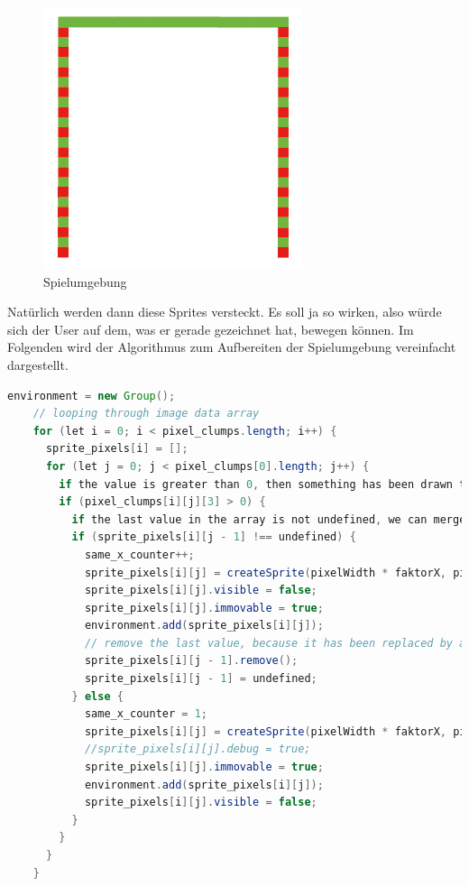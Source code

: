 \begin{figure}[H]
    \centering
    \includegraphics[scale=0.75]{pics/simpleDrawing3.PNG}
    \caption{Spielumgebung}
\end{figure}

Natürlich werden dann diese Sprites versteckt. Es soll ja so wirken, also würde sich der User auf dem, was er gerade gezeichnet hat, bewegen können.
Im Folgenden wird der Algorithmus zum Aufbereiten der Spielumgebung vereinfacht dargestellt. 
\begin{lstlisting}[caption=Erstellen der Spielumgebung,language=Java,label=lst:impl:createEnv]
    environment = new Group();
    // looping through image data array
    for (let i = 0; i < pixel_clumps.length; i++) {
      sprite_pixels[i] = [];
      for (let j = 0; j < pixel_clumps[0].length; j++) {
        if the value is greater than 0, then something has been drawn there
        if (pixel_clumps[i][j][3] > 0) {
          if the last value in the array is not undefined, we can merge the sprite-pixels
          if (sprite_pixels[i][j - 1] !== undefined) {
            same_x_counter++;
            sprite_pixels[i][j] = createSprite(pixelWidth * faktorX, pielWidth + faktorY, pixelWidth * same_x_counter, pixelWidth);
            sprite_pixels[i][j].visible = false;
            sprite_pixels[i][j].immovable = true;
            environment.add(sprite_pixels[i][j]);
            // remove the last value, because it has been replaced by a new sprite, with more width
            sprite_pixels[i][j - 1].remove();
            sprite_pixels[i][j - 1] = undefined;
          } else {
            same_x_counter = 1;
            sprite_pixels[i][j] = createSprite(pixelWidth * faktorX, pielWidth + faktorY, pixelWidth, pixelWidth); 
            //sprite_pixels[i][j].debug = true;
            sprite_pixels[i][j].immovable = true;
            environment.add(sprite_pixels[i][j]);
            sprite_pixels[i][j].visible = false;
          }
        }
      }
    }
\end{lstlisting}

